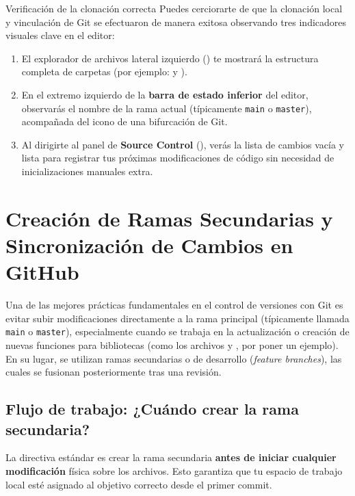 \documentclass[
10pt, %
a4paper, %
oneside, %
headinclude,footinclude, %
BCOR5mm, %
]{scrartcl}
\begin{document}
\begin{InfoBox}{Verificación de la clonación correcta}
	Puedes cerciorarte de que la clonación local y vinculación de Git se efectuaron de manera exitosa observando tres indicadores visuales clave en el editor:
	\begin{enumerate}
		\item El explorador de archivos lateral izquierdo () te mostrará la estructura completa de carpetas (por ejemplo:  y ).
		\item En el extremo izquierdo de la \textbf{barra de estado inferior} del editor, observarás el nombre de la rama actual (típicamente \texttt{main} o \texttt{master}), acompañada del icono de una bifurcación de Git.
		\item Al dirigirte al panel de \textbf{Source Control} (), verás la lista de cambios vacía y lista para registrar tus próximas modificaciones de código sin necesidad de inicializaciones manuales extra.
	\end{enumerate}
\end{InfoBox}

\newpage
\newpage
\section{Creación de Ramas Secundarias y Sincronización de Cambios en GitHub}

Una de las mejores prácticas fundamentales en el control de versiones con Git es evitar subir modificaciones directamente a la rama principal (típicamente llamada \texttt{main} o \texttt{master}), especialmente cuando se trabaja en la actualización o creación de nuevas funciones para bibliotecas (como los archivos  y , por poner un ejemplo). En su lugar, se utilizan ramas secundarias o de desarrollo (\textit{feature branches}), las cuales se fusionan posteriormente tras una revisión.

\subsection{Flujo de trabajo: ¿Cuándo crear la rama secundaria?}
La directiva estándar es crear la rama secundaria \textbf{antes de iniciar cualquier modificación} física sobre los archivos. Esto garantiza que tu espacio de trabajo local esté asignado al objetivo correcto desde el primer commit.
\end{document}
